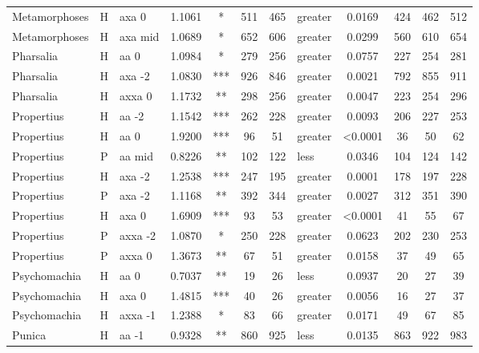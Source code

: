 \documentclass[twocolumn, switch]{article} %
\begin{document}
\begin{table}[h!]
\begin{adjustbox}{totalheight=0.9\textheight}
\begin{tabular}{lclcccclcc@{\hspace{1\tabcolsep}}c@{\hspace{1\tabcolsep}}c}
 Metamorphoses &     H &     axa 0 & 1.1061 &     * &   511 &       465 &     greater & 0.0169 &   424 &   462 &   512 \\
 Metamorphoses &     H &   axa mid & 1.0689 &     * &   652 &       606 &     greater & 0.0299 &   560 &   610 &   654 \\
     Pharsalia &     H &      aa 0 & 1.0984 &     * &   279 &       256 &     greater & 0.0757 &   227 &   254 &   281 \\
     Pharsalia &     H &    axa -2 & 1.0830 &   *** &   926 &       846 &     greater & 0.0021 &   792 &   855 &   911 \\
     Pharsalia &     H &    axxa 0 & 1.1732 &    ** &   298 &       256 &     greater & 0.0047 &   223 &   254 &   296 \\
    Propertius &     H &     aa -2 & 1.1542 &   *** &   262 &       228 &     greater & 0.0093 &   206 &   227 &   253 \\
    Propertius &     H &      aa 0 & 1.9200 &   *** &    96 &        51 &     greater & <0.0001 &    36 &    50 &    62 \\
    Propertius &     P &    aa mid & 0.8226 &    ** &   102 &       122 &        less & 0.0346 &   104 &   124 &   142 \\
    Propertius &     H &    axa -2 & 1.2538 &   *** &   247 &       195 &     greater & 0.0001 &   178 &   197 &   228 \\
    Propertius &     P &    axa -2 & 1.1168 &    ** &   392 &       344 &     greater & 0.0027 &   312 &   351 &   390 \\
    Propertius &     H &     axa 0 & 1.6909 &   *** &    93 &        53 &     greater & <0.0001 &    41 &    55 &    67 \\
    Propertius &     P &   axxa -2 & 1.0870 &     * &   250 &       228 &     greater & 0.0623 &   202 &   230 &   253 \\
    Propertius &     P &    axxa 0 & 1.3673 &    ** &    67 &        51 &     greater & 0.0158 &    37 &    49 &    65 \\
  Psychomachia &     H &      aa 0 & 0.7037 &    ** &    19 &        26 &        less & 0.0937 &    20 &    27 &    39 \\
  Psychomachia &     H &     axa 0 & 1.4815 &   *** &    40 &        26 &     greater & 0.0056 &    16 &    27 &    37 \\
  Psychomachia &     H &   axxa -1 & 1.2388 &     * &    83 &        66 &     greater & 0.0171 &    49 &    67 &    85 \\
        Punica &     H &     aa -1 & 0.9328 &    ** &   860 &       925 &        less & 0.0135 &   863 &   922 &   983 \\

\end{tabular}
\end{adjustbox}
\end{table}
\end{document}
